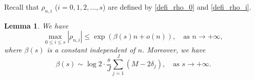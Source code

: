 \documentclass[12pt]{article}
\newtheorem{lemma}[theorem]{Lemma}
\numberwithin{equation}{section}
\begin{document}
\bigskip

Recall that $\rho_{n,i}$ ($i=0,1,2,\ldots,s$) are defined by \eqref{defi_rho_0} and \eqref{defi_rho_i}. 

\begin{lemma}\label{lem_ana_rho}
We have 
\begin{equation}\label{rho_estimate}
\max_{0 \leqslant i \leqslant s} |\rho_{n,i}| \leqslant \exp\left( \beta(s)n + o(n) \right), \quad \text{as~} n \to +\infty, 
\end{equation}
where $\beta(s)$ is a constant independent of $n$. Moreover, we have
\begin{equation}\label{beta}
\beta(s) \sim \log2 \cdot \frac{s}{J} \sum_{j=1}^{J} (M - 2\delta_j), \quad\text{as~} s \to +\infty. 
\end{equation}
\end{lemma}
\end{document}
